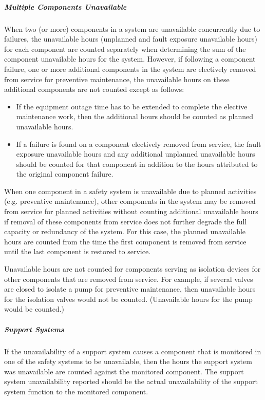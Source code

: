 \subparagraph{Multiple Components Unavailable}

When two (or more) components in a system are unavailable concurrently
due to failures, the unavailable hours (unplanned and fault exposure
unavailable hours) for each component are counted separately when
determining the sum of the component unavailable hours for the
system. However, if following a component failure, one or more
additional components in the system are electively removed from
service for preventive maintenance, the unavailable hours on these
additional components are not counted except as follows:
\begin{itemize}
\item If the equipment outage time has to be extended to complete the elective maintenance work, then the additional hours should be counted as planned unavailable hours.
\item If a failure is found on a component electively removed from
  service, the fault exposure unavailable hours and any additional
  unplanned unavailable hours should be counted for that component in
  addition to the hours attributed to the original component failure.
\end{itemize}

When one component in a safety system is unavailable due to planned
activities (e.g. preventive maintenance), other components in the
system may be removed from service for planned activities without
counting additional unavailable hours if removal of these components
from service does not further degrade the full capacity or redundancy
of the system. For this case, the planned unavailable hours are
counted from the time the first component is removed from service
until the last component is restored to service.

Unavailable hours are not counted for components serving as isolation
devices for other components that are removed from service. For
example, if several valves are closed to isolate a pump for preventive
maintenance, then unavailable hours for the isolation valves would not
be counted. (Unavailable hours for the pump would be counted.)

\subparagraph{Support Systems}

If the unavailability of a support system causes a component that is
monitored in one of the safety systems to be unavailable, then the
hours the support system was unavailable are counted against the
monitored component. The support system unavailability reported should
be the actual unavailability of the support system function to the
monitored component.

